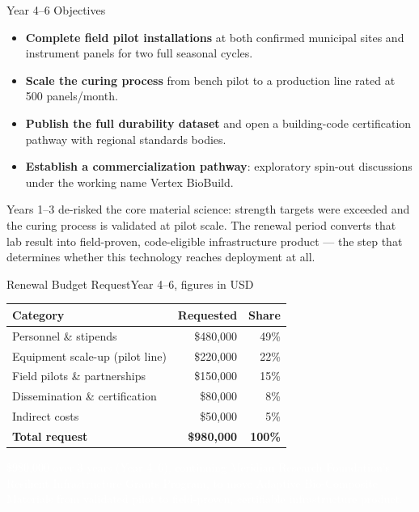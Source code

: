 \begin{frame}{Year 4--6 Objectives}
\small
\begin{itemize}[leftmargin=*, itemsep=3pt, topsep=2pt]
  \item[\textcolor{gold}{\textbf{1.}}] \textbf{Complete field pilot installations} at both confirmed
    municipal sites and instrument panels for two full seasonal cycles.
  \item[\textcolor{gold}{\textbf{2.}}] \textbf{Scale the curing process} from bench pilot to a
    production line rated at 500 panels/month.
  \item[\textcolor{gold}{\textbf{3.}}] \textbf{Publish the full durability dataset} and open a
    building-code certification pathway with regional standards bodies.
  \item[\textcolor{gold}{\textbf{4.}}] \textbf{Establish a commercialization pathway}: exploratory
    spin-out discussions under the working name Vertex BioBuild.
\end{itemize}

\par\vspace{3pt}
\begin{tcolorbox}[infobox, title=Why Renew Now]
\scriptsize
Years 1--3 de-risked the core material science: strength targets were
exceeded and the curing process is validated at pilot scale. The
renewal period converts that lab result into field-proven,
code-eligible infrastructure product --- the step that determines
whether this technology reaches deployment at all.
\end{tcolorbox}
\end{frame}

\begin{frame}{Renewal Budget Request}{Year 4--6, figures in USD}
\small
\renewcommand{\arraystretch}{1.0}
\begin{tabular}{@{}lrr@{}}
\toprule
\textbf{Category} & \textbf{Requested} & \textbf{Share} \\
\midrule
Personnel \& stipends & \$480,000 & 49\% \\
\rowcolor{mist}
Equipment scale-up (pilot line) & \$220,000 & 22\% \\
Field pilots \& partnerships & \$150,000 & 15\% \\
\rowcolor{mist}
Dissemination \& certification & \$80,000 & 8\% \\
Indirect costs & \$50,000 & 5\% \\
\midrule
\textbf{Total request} & \textbf{\$980,000} & \textbf{100\%} \\
\bottomrule
\end{tabular}

\par\vspace{5pt}
\begin{tcolorbox}[askbox, title={\color{gold}Renewal Ask}, top=4pt, bottom=4pt]
\footnotesize\textcolor{white}{\$980,000 over 3 years (Year 4--6), continuing
Meridian Research Foundation's Resilient Infrastructure Grants
Program, to move Adaptive Bio-Composite Materials from validated
pilot to field-proven, certifiable infrastructure product.}
\end{tcolorbox}
\end{frame}
